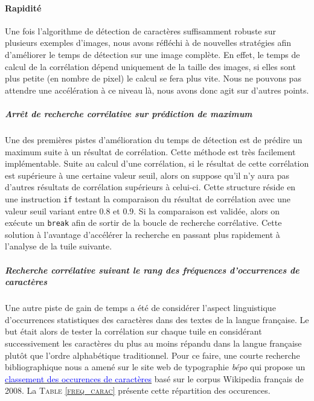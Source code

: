 \documentclass[a4paper,12pt,titlepage]{report}
\begin{document}
	\paragraph{Rapidité}
	Une fois l'algorithme de détection de caractères suffisamment robuste sur plusieurs exemples d'images, nous avons réfléchi à de nouvelles stratégies afin d'améliorer le temps de détection sur une image complète.
	En effet, le temps de calcul de la corrélation dépend uniquement de la taille des images, si elles sont plus petite (en nombre de pixel) le calcul se fera plus vite. Nous ne pouvons pas attendre une accélération à ce niveau là, nous avons donc agit sur d'autres points.
	\subparagraph{Arrêt de recherche corrélative sur prédiction de maximum}
	\label{stop_cor}
	Une des premières pistes d'amélioration du temps de détection est de prédire un maximum suite à un résultat de corrélation. Cette méthode est très facilement implémentable. Suite au calcul d'une corrélation, si le résultat de cette corrélation est supérieure à une certaine valeur seuil, alors on suppose qu'il n'y aura pas d'autres résultats de corrélation supérieurs à celui-ci. Cette structure réside en une instruction \texttt{if} testant la comparaison du résultat de corrélation avec une valeur seuil variant entre 0.8 et 0.9. Si la comparaison est validée, alors on exécute un \texttt{break} afin de sortir de la boucle de recherche corrélative. Cette solution à l'avantage d'accélérer la recherche en passant plus rapidement à l'analyse de la tuile suivante.
	
	\subparagraph{Recherche corrélative suivant le rang des fréquences d’occurrences de caractères}	 
	 Une autre piste de gain de temps a été de considérer l'aspect linguistique d’occurrences statistiques des caractères dans des textes de la langue française. Le but était alors de tester la corrélation sur chaque tuile en considérant successivement les caractères du plus au moins répandu dans la langue française plutôt que l'ordre alphabétique traditionnel. Pour ce faire, une courte recherche bibliographique nous a amené sur le site web de typographie \textit{bépo} qui propose un \href{http://bepo.fr/wiki/Fr%C3%A9quence_des_caract%C3%A8res}{\textcolor{blue}{classement des occurences de caractères}} basé sur le corpus Wikipedia français de 2008. La \textsc{Table \ref{freq_carac}} présente cette répartition des occurences. 
	 
\newpage
\end{document}
